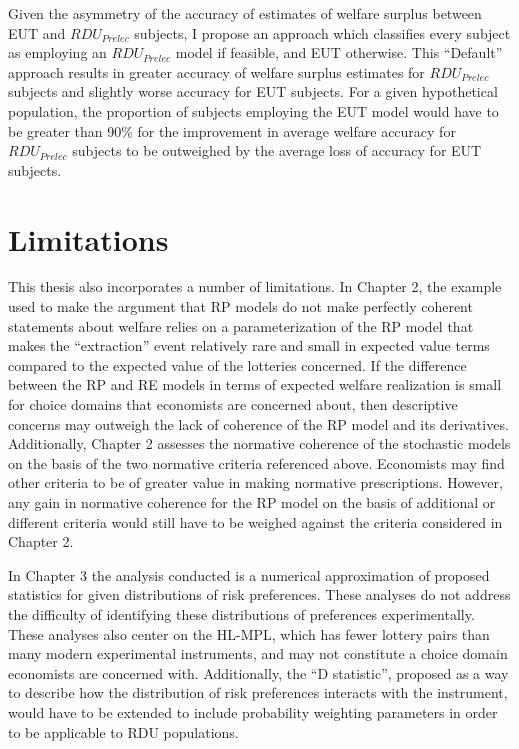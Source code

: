 \documentclass[../main.tex]{subfiles}
\begin{document}
Given the asymmetry of the accuracy of estimates of welfare surplus between EUT and $\mathit{RDU_{Prelec}}$ subjects, I propose an approach which classifies every subject as employing an $\mathit{RDU_{Prelec}}$ model if feasible, and EUT otherwise.
This \enquote{Default} approach results in greater accuracy of welfare surplus estimates for $\mathit{RDU_{Prelec}}$ subjects and slightly worse accuracy for EUT subjects.
For a given hypothetical population, the proportion of subjects employing the EUT model would have to be greater than 90\% for the improvement in average welfare accuracy for $\mathit{RDU_{Prelec}}$ subjects to be outweighed by the average loss of accuracy for EUT subjects.



\section{Limitations}
This thesis also incorporates a number of limitations.
In Chapter 2, the example used to make the argument that RP models do not make perfectly coherent statements about welfare relies on a parameterization of the RP model that makes the \enquote{extraction} event relatively rare and small in expected value terms compared to the expected value of the lotteries concerned.
If the difference between the RP and RE models in terms of expected welfare realization is small for choice domains that economists are concerned about, then descriptive concerns may outweigh the lack of coherence of the RP model and its derivatives.
Additionally, Chapter 2 assesses the normative coherence of the stochastic models on the basis of the two normative criteria referenced above.
Economists may find other criteria to be of greater value in making normative prescriptions.
However, any gain in normative coherence for the RP model on the basis of additional or different criteria would still have to be weighed against the criteria considered in Chapter 2.

In Chapter 3 the analysis conducted is a numerical approximation of proposed statistics for given distributions of risk preferences.
These analyses do not address the difficulty of identifying these distributions of preferences experimentally.
These analyses also center on the HL-MPL, which has fewer lottery pairs than many modern experimental instruments, and may not constitute a choice domain economists are concerned with.
Additionally, the \enquote{D statistic}, proposed as a way to describe how the distribution of risk preferences interacts with the instrument, would have to be extended to include probability weighting parameters in order to be applicable to RDU populations.
\end{document}
